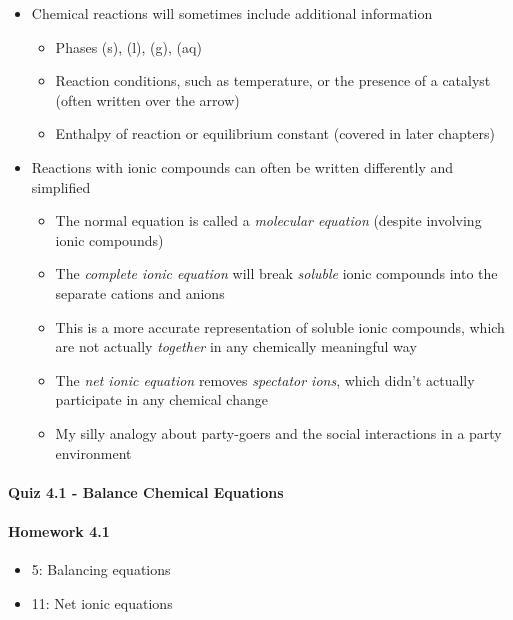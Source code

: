 \documentclass[12pt, openany, letterpaper]{memoir}
\begin{document}
\begin{itemize}
  ~\hphantom{Practice:} 
  \item Chemical reactions will sometimes include additional information
    \begin{itemize}
      \item Phases (s), (l), (g), (aq)
      \item Reaction conditions, such as temperature, or the presence of a catalyst (often written over the arrow)
      \item Enthalpy of reaction or equilibrium constant (covered in later chapters)
    \end{itemize}
  \item Reactions with ionic compounds can often be written differently and simplified
    \begin{itemize}
      \item The normal equation is called a \emph{molecular equation} (despite involving ionic compounds)

      \item The \emph{complete ionic equation} will break \emph{soluble} ionic compounds into the separate cations and anions
      \item This is a more accurate representation of soluble ionic compounds, which are not actually \emph{together} in any chemically meaningful way

      \item The \emph{net ionic equation} removes \emph{spectator ions}, which didn't actually participate in any chemical change
      \item My silly analogy about party-goers and the social interactions in a party environment

    \end{itemize}
\end{itemize}

\paragraph*{Quiz 4.1 - Balance Chemical Equations}
\paragraph*{Homework 4.1}
\begin{itemize}
  \item 5: Balancing equations 
  \item 11: Net ionic equations
\end{itemize}
\end{document}

